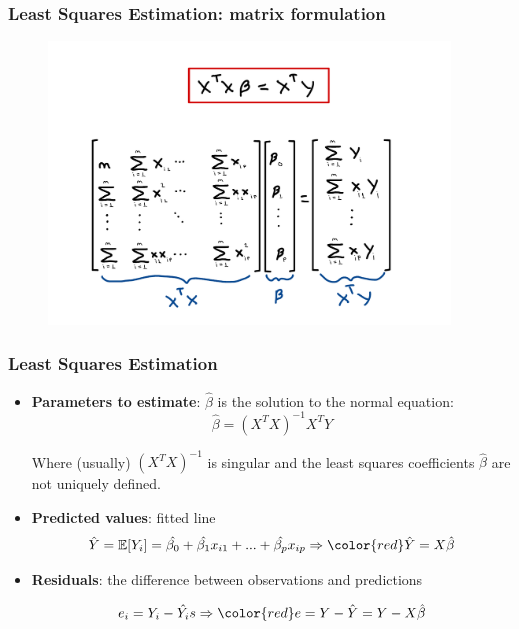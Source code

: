 \begin{frame}
    \frametitle{Least Squares Estimation: matrix formulation}
    \begin{figure}
        \centering
        \includegraphics[width=0.95\textwidth]{sections/least_squares_estimation/figures/xxb-xy.pdf}
    \end{figure}
\end{frame}



\begin{frame}
    \frametitle{Least Squares Estimation}

    \begin{itemize}

        \item \textbf{Parameters to estimate}: $\hat{\beta}$ is the solution to the normal equation:
        $$\hat{\beta}=(X^TX)^{-1}X^TY$$
        
        Where (usually) $(X^TX)^{-1}$ is singular and the least squares 
        coefficients $\hat{\beta}$ are not uniquely defined.


        \item \textbf{Predicted values}: fitted line
        $$\hat{Y} = \E[Y_i] = \hat{\beta_0}+\hat{\beta_1}x_{i1}+...+\hat{\beta_{p}}x_{ip} \Rightarrow {\color{red}\hat{Y}=X\hat{\beta}}$$

        \item \textbf{Residuals}: the difference between observations and predictions

        $$e_i = Y_i - \hat{Y_i}s \Rightarrow {\color{red}e = Y - \hat{Y} = Y - X\hat{\beta}}$$
    \end{itemize}

\end{frame}

